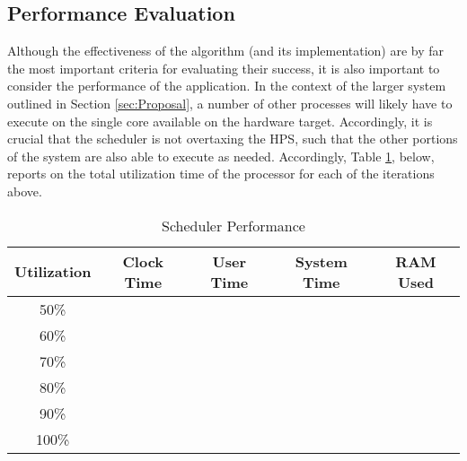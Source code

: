 \subsection{Performance Evaluation}\label{performanceData}
Although the effectiveness of the algorithm (and its implementation) are by far the most important criteria for evaluating their success, it is also important to consider the performance of the application. In the context of the larger system outlined in Section \ref{sec:Proposal}, a number of other processes will likely have to execute on the single core available on the hardware target. Accordingly, it is crucial that the scheduler is not overtaxing the HPS, such that the other portions of the system are also able to execute as needed. Accordingly, Table \ref{table:2}, below, reports on the total utilization time of the processor for each of the iterations above.

\begin{table}[h!]
    \centering\begin{tabular}{| c | c | c | c | c |}
        \hline
        Utilization & Clock Time & User Time & System Time & RAM Used \\
        \hline
        50\% & & & & \\
        60\% & & & & \\
        70\% & & & & \\
        80\% & & & &\\
        90\% & & & &\\
        100\% & & & &\\
        \hline
    \end{tabular}
    \caption{Scheduler Performance}
    \label{table:2}
\end{table}